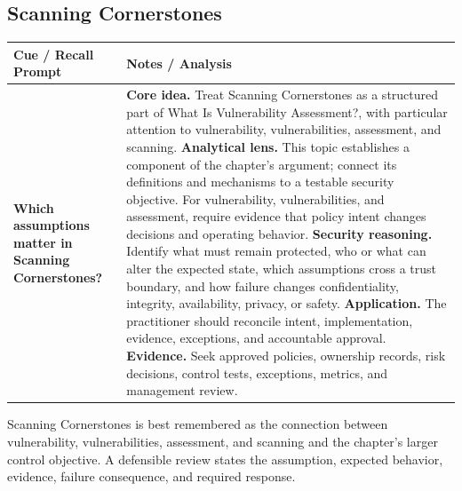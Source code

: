 \documentclass[11pt]{article}
\newcommand{\CornellHeader}{%
\rowcolor{Navy}\color{white}\bfseries Cue / Recall Prompt & \color{white}\bfseries Notes / Analysis\\\hline}
\newcommand{\CornellRow}[2]{%
\cellcolor{CueGray}\RaggedRight\textbf{#1} & \RaggedRight #2\\\hline}
\begin{document}
\subsection*{Scanning Cornerstones}
\begin{longtable}{>{\RaggedRight\arraybackslash}p{}|>{\RaggedRight\arraybackslash}p{}}
\CornellHeader
\CornellRow{Which assumptions matter in Scanning Cornerstones?}{\textbf{Core idea.} Treat Scanning Cornerstones as a structured part of What Is Vulnerability Assessment?, with particular attention to vulnerability, vulnerabilities, assessment, and scanning. \textbf{Analytical lens.} This topic establishes a component of the chapter's argument; connect its definitions and mechanisms to a testable security objective. For vulnerability, vulnerabilities, and assessment, require evidence that policy intent changes decisions and operating behavior. \textbf{Security reasoning.} Identify what must remain protected, who or what can alter the expected state, which assumptions cross a trust boundary, and how failure changes confidentiality, integrity, availability, privacy, or safety. \textbf{Application.} The practitioner should reconcile intent, implementation, evidence, exceptions, and accountable approval. \textbf{Evidence.} Seek approved policies, ownership records, risk decisions, control tests, exceptions, metrics, and management review.}
\end{longtable}
\begin{topicsummary}
Scanning Cornerstones is best remembered as the connection between vulnerability, vulnerabilities, assessment, and scanning and the chapter's larger control objective. A defensible review states the assumption, expected behavior, evidence, failure consequence, and required response.
\end{topicsummary}
\end{document}
